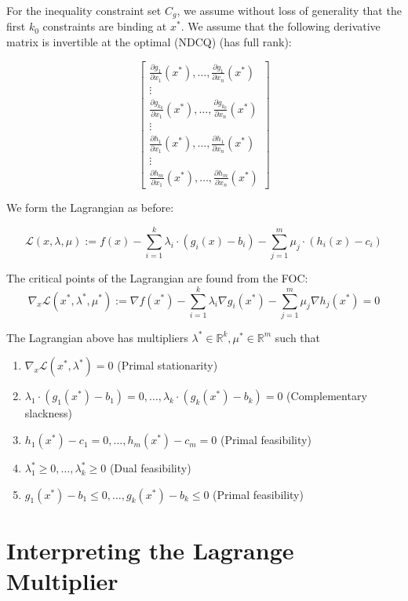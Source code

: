 \documentclass[11pt,]{article}
\providecommand{\tightlist}{%
  \setlength{\itemsep}{0pt}\setlength{\parskip}{0pt}}
\begin{document}
For the inequality constraint set \(C_g\), we assume without loss of
generality that the first \(k_0\) constraints are binding at \(x^*\). We
assume that the following derivative matrix is invertible at the optimal
(NDCQ) (has full rank):

\[
\begin{bmatrix}
\frac{\partial g_1}{\partial x_1}(x^*),\hdots,\frac{\partial g_{1}}{\partial x_n}(x^*)\\
\vdots\\
\frac{\partial g_{k_0}}{\partial x_1}(x^*),\hdots,\frac{\partial g_{k_0}}{\partial x_n}(x^*)\\
\vdots\\
\frac{\partial h_1}{\partial x_1}(x^*),\hdots,\frac{\partial h_1}{\partial x_n}(x^*)\\
\vdots\\
\frac{\partial h_m}{\partial x_1}(x^*),\hdots,\frac{\partial h_m}{\partial x_n}(x^*)
\end{bmatrix}
\]

We form the Lagrangian as before:

\[
\mathcal{L}(x,\lambda,\mu) := f(x)-\sum_{i=1}^k \lambda_i\cdot(g_i(x)-b_i)-
\sum_{j=1}^m \mu_j\cdot(h_i(x)-c_i)
\]

The critical points of the Lagrangian are found from the FOC: \[
\nabla_x\mathcal{L}(x^*,\lambda^*,\mu^*) := \nabla f(x^*)-
\sum_{i=1}^k\lambda_i\nabla g_i(x^*) -
\sum_{j=1}^m\mu_j\nabla h_j(x^*)=0
\]

The Lagrangian above has multipliers
\(\lambda^*\in \mathbb{R}^k, \mu^*\in \mathbb{R}^m\) such that

\begin{enumerate}
\def\labelenumi{\arabic{enumi}.}
\tightlist
\item
  \(\nabla_x\mathcal{L}(x^*,\lambda^*)=0\) (Primal stationarity)
\item
  \(\lambda_1\cdot(g_1(x^*)-b_1)=0,\hdots,\lambda_k\cdot(g_k(x^*)-b_k)=0\)
  (Complementary slackness)
\item
  \(h_1(x^*)-c_1=0,\hdots,h_m(x^*)-c_m=0\) (Primal feasibility)
\item
  \(\lambda_1^*\geq 0,\hdots,\lambda_k^*\geq 0\) (Dual feasibility)
\item
  \(g_1(x^*)-b_1\leq 0,\hdots,g_k(x^*)-b_k\leq 0\) (Primal feasibility)
\end{enumerate}

\section{Interpreting the Lagrange
Multiplier}\label{interpreting-the-lagrange-multiplier}
\end{document}
